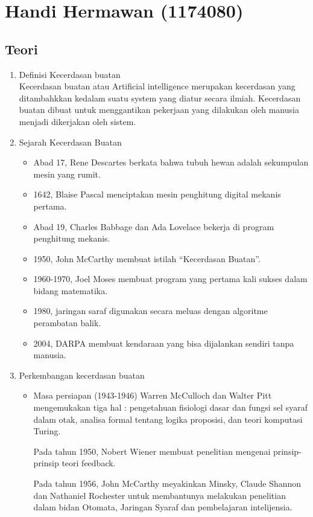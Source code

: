 \section{Handi Hermawan (1174080)}
\subsection{Teori}
\begin{enumerate}
\item Definisi Kecerdasan buatan\\ 
Kecerdasan buatan atau Artificial intelligence merupakan kecerdasan yang ditambahkkan kedalam suatu system yang diatur secara ilmiah. Kecerdasan buatan dibuat untuk menggantikan pekerjaan yang dilakukan oleh manusia menjadi dikerjakan oleh sistem.

\item Sejarah Kecerdasan Buatan
\begin{itemize}
\item Abad 17, Rene Descartes berkata bahwa tubuh hewan adalah sekumpulan mesin yang rumit.
\item 1642, Blaise Pascal menciptakan mesin penghitung digital mekanis pertama.
\item Abad 19, Charles Babbage dan Ada Lovelace bekerja di program penghitung mekanis.
\item 1950, John McCarthy membuat istilah “Kecerdasan Buatan”.
\item 1960-1970, Joel Moses membuat program yang pertama kali sukses dalam bidang matematika.
\item 1980, jaringan saraf digunakan secara meluas dengan algoritme perambatan balik.
\item 2004, DARPA membuat kendaraan yang bisa dijalankan sendiri tanpa manusia.
\end{itemize}

\item Perkembangan kecerdasan buatan
\begin{itemize}
\item Masa persiapan (1943-1946)
Warren McCulloch dan Walter Pitt mengemukakan tiga hal : pengetahuan fisiologi dasar dan fungsi sel syaraf dalam otak, analisa formal tentang logika proposisi, dan teori komputasi Turing.

Pada tahun 1950, Nobert Wiener membuat penelitian mengenai prinsip-prinsip teori feedback.

Pada tahun 1956, John McCarthy meyakinkan Minsky, Claude Shannon dan Nathaniel Rochester untuk membantunya melakukan penelitian dalam bidan Otomata, Jaringan Syaraf dan pembelajaran intelijensia. 


\end{itemize}
\end{enumerate}
